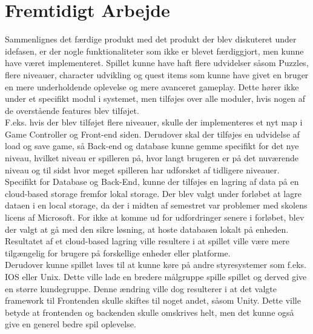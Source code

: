 \section{Fremtidigt Arbejde}
Sammenlignes det færdige produkt med det produkt der blev diskuteret under idefasen, er der nogle funktionaliteter som ikke er blevet færdiggjort, men kunne have været implementeret. Spillet kunne have haft flere udvidelser såsom Puzzles, flere niveauer, character udvikling og quest items som kunne have givet en bruger en mere underholdende oplevelse og mere avanceret gameplay. Dette hører ikke under et specifikt modul i systemet, men tilføjes over alle moduler, hvis nogen af de overstående features blev tilføjet. \\

\noindent F.eks. hvis der blev tilføjet flere niveauer, skulle der implementeres et nyt map i Game Controller og Front-end siden. Derudover skal der tilføjes en udvidelse af load og save game, så Back-end og database kunne gemme specifikt for det nye niveau, hvilket niveau er spilleren på, hvor langt brugeren er på det nuværende niveau og til sidst hvor meget spilleren har udforsket af tidligere niveauer.\\

\noindent Specifikt for Database og Back-End, kunne der tilføjes en lagring af data på en cloud-based storage fremfor lokal storage. Der blev valgt under forløbet at lagre dataen i en local storage, da der i midten af semestret var problemer med skolens licens af Microsoft. For ikke at komme ud for udfordringer senere i forløbet, blev der valgt at gå med den sikre løsning, at hoste databasen lokalt på enheden. Resultatet af et cloud-based lagring ville resultere i at spillet ville være mere tilgængelig for brugere på forskellige enheder eller platforme. \\

\noindent Derudover kunne spillet laves til at kunne køre på andre styresystemer som f.eks. IOS eller Unix. Dette ville lade en bredere målgruppe spille spillet og derved give en større kundegruppe. Denne ændring ville dog resulterer i at det valgte framework til Frontenden skulle skiftes til noget andet, såsom Unity. Dette ville betyde at frontenden og backenden skulle omskrives helt, men det kunne også give en generel bedre spil oplevelse.


